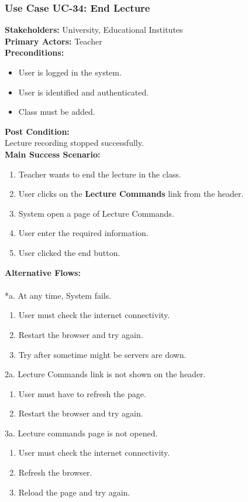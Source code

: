 \documentclass[12pt]{article}
\begin{document}
\subsubsection{Use Case UC-34: End Lecture}
\textbf{Stakeholders: } University, Educational Institutes \\
\textbf{Primary Actors: }Teacher\\
\textbf{Preconditions:}
\begin{itemize}
\item User is logged in the system.
\item User is identified and authenticated.
\item Class must be added.
\end{itemize}
\textbf{Post Condition: }\\
Lecture recording stopped successfully.\\
\textbf{Main Success Scenario:}
\begin{enumerate}
\item Teacher wants to end the lecture in the class.
\item User clicks on the \textbf{Lecture Commands} link from the header.
\item System open a page of Lecture Commands.
\item User enter the required information.
\item User clicked the end button.
\end{enumerate}
\textbf{Alternative Flows:}\\
\\
*a. At any time, System fails.
\begin{enumerate}
\item User must check the internet connectivity.
\item Restart the browser and try again.
\item Try after sometime might be servers are down.
\end{enumerate}
2a. Lecture Commands link is not shown on the header.
\begin{enumerate}
\item User must have to refresh the page.
\item Restart the browser and try again.
\end{enumerate} 
3a. Lecture commands page is not opened.
\begin{enumerate}
\item User must check the internet connectivity.
\item Refresh the browser.
\item Reload the page and try again.
\end{enumerate}
\end{document}
